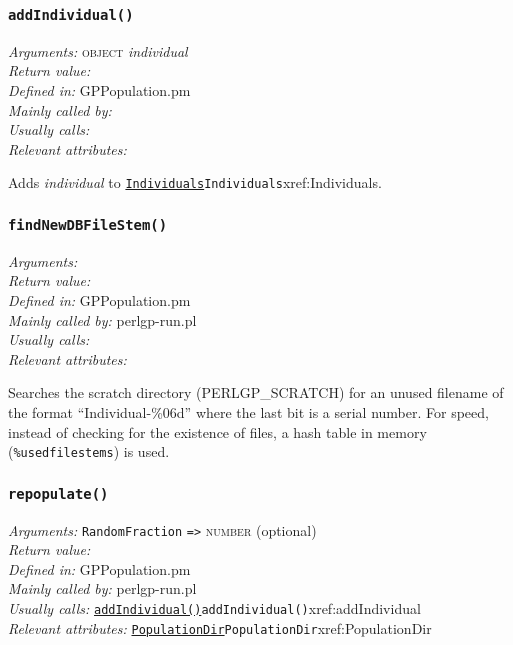 \documentclass[a4paper]{article}
\begin{document}
\subsubsection{\texttt{addIndividual()}}\label{xref:addIndividual}
\begin{flushleft}
\textit{Arguments:} \textsc{object} \textit{individual}\\
\textit{Return value:} \\
\textit{Defined in:} GPPopulation.pm\\
\textit{Mainly called by:} \\
\textit{Usually calls:} \\
\textit{Relevant attributes:}
\end{flushleft}

Adds \textit{individual} to \hyperref[no]{\texttt{Individuals}}{\texttt{Individuals}}{xref:Individuals}.

\subsubsection{\texttt{findNewDBFileStem()}}\label{xref:findNewDBFileStem}
\begin{flushleft}
\textit{Arguments:} \\
\textit{Return value:} \\
\textit{Defined in:} GPPopulation.pm\\
\textit{Mainly called by:} perlgp-run.pl\\
\textit{Usually calls:} \\
\textit{Relevant attributes:}
\end{flushleft}

Searches the scratch directory (PERLGP\_SCRATCH) for an unused filename
of the format ``Individual-\%06d'' where the last bit is a serial
number.  For speed, instead of checking for the existence of files, a
hash table in memory (\texttt{\%usedfilestems}) is used.


\subsubsection{\texttt{repopulate()}}\label{xref:repopulate}
\begin{flushleft}
\textit{Arguments:} \texttt{RandomFraction} \verb:=>: \textsc{number} (optional)\\
\textit{Return value:} \\
\textit{Defined in:} GPPopulation.pm\\
\textit{Mainly called by:} perlgp-run.pl\\
\textit{Usually calls:} \hyperref[no]{\texttt{addIndividual()}}{\texttt{addIndividual()}}{xref:addIndividual}\\
\textit{Relevant attributes:} \hyperref[no]{\texttt{PopulationDir}}{\texttt{PopulationDir}}{xref:PopulationDir}
\end{flushleft}
\end{document}
